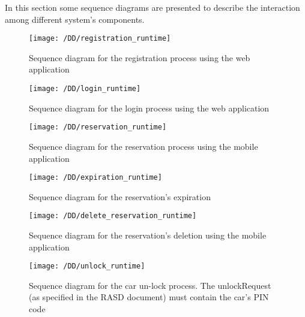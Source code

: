In this section some sequence diagrams are presented to describe the interaction among different system's components.

\begin{figure}[!ht]
  \centering
  \vspace{0.2cm}
  \texttt{[image: /DD/registration\_runtime]}\\
  \vspace{0.4cm}
  \caption{Sequence diagram for the registration process using the web application} 
  \label{fig:registration_runtime} 
\end{figure}
\newpage
\begin{figure}[!ht]
  \centering
  \vspace{0.2cm}
  \texttt{[image: /DD/login\_runtime]}\\
  \vspace{0.4cm}
  \caption{Sequence diagram for the login process using the web application} 
  \label{fig:login_runtime} 
\end{figure}
\newpage
\begin{figure}[!ht]
  \centering
  \vspace{0.2cm}
  \texttt{[image: /DD/reservation\_runtime]}\\
  \vspace{0.4cm}
  \caption{Sequence diagram for the reservation process using the mobile application} 
  \label{fig:reservation_runtime} 
\end{figure}
\newpage
\begin{figure}[!ht]
  \centering
  \vspace{0.2cm}
  \texttt{[image: /DD/expiration\_runtime]}\\
  \vspace{0.4cm}
  \caption{Sequence diagram for the reservation's expiration} 
  \label{fig:expiration_runtime} 
\end{figure}
\newpage
\begin{figure}[!ht]
  \centering
  \vspace{0.2cm}
  \texttt{[image: /DD/delete\_reservation\_runtime]}\\
  \vspace{0.4cm}
  \caption{Sequence diagram for the reservation's deletion using the mobile application} 
  \label{fig:delete_reservation_runtime} 
\end{figure}
\newpage
\begin{figure}[!ht]
  \centering
  \vspace{0.2cm}
  \texttt{[image: /DD/unlock\_runtime]}\\
  \vspace{0.4cm}
  \caption{Sequence diagram for the car un-lock process. The unlockRequest (as specified in the RASD document) must contain the car's PIN code} 
  \label{fig:unlock_runtime} 
\end{figure}
